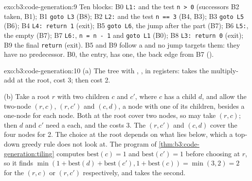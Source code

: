 \begin{solution}{exo:b3:code-generation:9}
Ten blocks: B0 \texttt{L1:} and the test \texttt{n > 0} (successors B2 taken, B1); B1 \texttt{goto L3} (B8); B2 \texttt{L2:} and the test \texttt{n == 3} (B4, B3); B3 \texttt{goto L5} (B6); B4 \texttt{L4: return 1} (exit); B5 \texttt{goto L6}, the jump after the  part (B7); B6 \texttt{L5:}, the empty  (B7); B7 \texttt{L6:}, \texttt{n = n - 1} and \texttt{goto L1} (B0); B8 \texttt{L3: return 0} (exit); B9 the final \texttt{return} (exit). B5 and B9 follow a  and no jump targets them: they have no predecessor. B0, the entry, has one, the back edge from B7 ().
\end{solution}

\begin{solution}{exo:b3:code-generation:10}
(a) The tree  with , ,  in registers:  takes the multiply-add at the root, cost 3;  then  cost 2.

(b) Take a root $r$ with two children $c$ and $c'$, where $c$ has a child $d$, and allow the two-node  $(r, c)$, $(r, c')$ and $(c, d)$, a node with one of its children, besides a one-node  for each node. Both  at the root cover two nodes, so  may take $(r, c)$; then $d$ and $c'$ need a  each, and the  costs 3. The  $(r, c')$ and $(c, d)$ cover the four nodes for 2. The choice at the root depends on what lies below, which a top-down greedy rule does not look at. The program of \cref{thm:b3:code-generation:tiling} computes $\mathrm{best}(c) = 1$ and $\mathrm{best}(c') = 1$ before choosing at $r$, so it finds $\min(1 + \mathrm{best}(d) + \mathrm{best}(c'), 1 + \mathrm{best}(c)) = \min(3, 2) = 2$ for the  $(r, c)$ or $(r, c')$ respectively, and takes the second.
\end{solution}

